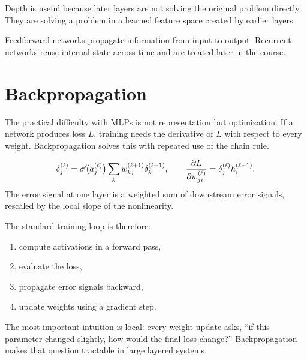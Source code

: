 \begin{aside}
Depth is useful because later layers are not solving the original problem directly. They are solving a problem in a learned feature space created by earlier layers.
\end{aside}

Feedforward networks propagate information from input to output. Recurrent networks reuse internal state across time and are treated later in the course.

\section{Backpropagation}

The practical difficulty with MLPs is not representation but optimization. If a network produces loss $L$, training needs the derivative of $L$ with respect to every weight. Backpropagation solves this with repeated use of the chain rule.

\begin{keyequation}
\[
\delta_j^{(\ell)}
=
\sigma'\!\bigl(a_j^{(\ell)}\bigr)
\sum_k w_{kj}^{(\ell+1)} \delta_k^{(\ell+1)},
\qquad
\frac{\partial L}{\partial w_{ji}^{(\ell)}} = \delta_j^{(\ell)} h_i^{(\ell-1)}.
\]
\tcblower
The error signal at one layer is a weighted sum of downstream error signals, rescaled by the local slope of the nonlinearity.
\end{keyequation}

The standard training loop is therefore:
\begin{enumerate}
  \item compute activations in a forward pass,
  \item evaluate the loss,
  \item propagate error signals backward,
  \item update weights using a gradient step.
\end{enumerate}

The most important intuition is local: every weight update asks, ``if this parameter changed slightly, how would the final loss change?'' Backpropagation makes that question tractable in large layered systems.
